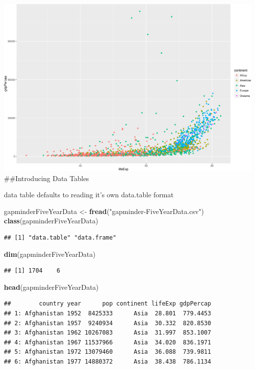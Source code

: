 \documentclass[]{article}
\newenvironment{Shaded}{\begin{snugshade}}{\end{snugshade}}
\newcommand{\KeywordTok}[1]{\textcolor[rgb]{0.13,0.29,0.53}{\textbf{{#1}}}}
\newcommand{\StringTok}[1]{\textcolor[rgb]{0.31,0.60,0.02}{{#1}}}
\newcommand{\NormalTok}[1]{{#1}}
\begin{document}
\includegraphics{Figs/unnamed-chunk-4-1.pdf}\\
 \#\#Introducing Data Tables

data table defaults to reading it's own data.table format

\begin{Shaded}
\begin{Highlighting}[]
\NormalTok{gapminderFiveYearData <-}\StringTok{ }\KeywordTok{fread}\NormalTok{(}\StringTok{"gapminder-FiveYearData.csv"}\NormalTok{)}
\KeywordTok{class}\NormalTok{(gapminderFiveYearData)}
\end{Highlighting}
\end{Shaded}

\begin{verbatim}
## [1] "data.table" "data.frame"
\end{verbatim}

\begin{Shaded}
\begin{Highlighting}[]
\KeywordTok{dim}\NormalTok{(gapminderFiveYearData)}
\end{Highlighting}
\end{Shaded}

\begin{verbatim}
## [1] 1704    6
\end{verbatim}

\begin{Shaded}
\begin{Highlighting}[]
\KeywordTok{head}\NormalTok{(gapminderFiveYearData)}
\end{Highlighting}
\end{Shaded}

\begin{verbatim}
##        country year      pop continent lifeExp gdpPercap
## 1: Afghanistan 1952  8425333      Asia  28.801  779.4453
## 2: Afghanistan 1957  9240934      Asia  30.332  820.8530
## 3: Afghanistan 1962 10267083      Asia  31.997  853.1007
## 4: Afghanistan 1967 11537966      Asia  34.020  836.1971
## 5: Afghanistan 1972 13079460      Asia  36.088  739.9811
## 6: Afghanistan 1977 14880372      Asia  38.438  786.1134
\end{verbatim}
\end{document}
